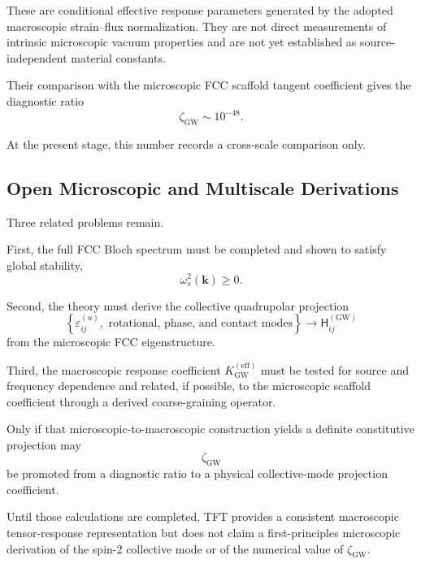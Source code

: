 These are conditional effective response parameters generated by the adopted macroscopic strain--flux normalization. They are not direct measurements of intrinsic microscopic vacuum properties and are not yet established as source-independent material constants.

Their comparison with the microscopic FCC scaffold tangent coefficient gives the diagnostic ratio
\begin{equation}
    \zeta_{\mathrm{GW}} \sim 10^{-48}.
\end{equation}

At the present stage, this number records a cross-scale comparison only.

\subsection*{Open Microscopic and Multiscale Derivations}

Three related problems remain.

First, the full FCC Bloch spectrum must be completed and shown to satisfy global stability,
\begin{equation}
    \omega_s^2(\mathbf{k}) \geq 0.
\end{equation}

Second, the theory must derive the collective quadrupolar projection
\begin{equation}
    \left\{ \varepsilon_{ij}^{(u)}, \text{ rotational, phase, and contact modes} \right\} \longrightarrow \mathsf{H}_{ij}^{(\mathrm{GW})}
\end{equation}
from the microscopic FCC eigenstructure.

Third, the macroscopic response coefficient $K_{\mathrm{GW}}^{(\mathrm{eff})}$ must be tested for source and frequency dependence and related, if possible, to the microscopic scaffold coefficient through a derived coarse-graining operator.

Only if that microscopic-to-macroscopic construction yields a definite constitutive projection may
\begin{equation}
    \zeta_{\mathrm{GW}}
\end{equation}
be promoted from a diagnostic ratio to a physical collective-mode projection coefficient.

Until those calculations are completed, TFT provides a consistent macroscopic tensor-response representation but does not claim a first-principles microscopic derivation of the spin-2 collective mode or of the numerical value of $\zeta_{\mathrm{GW}}$.

